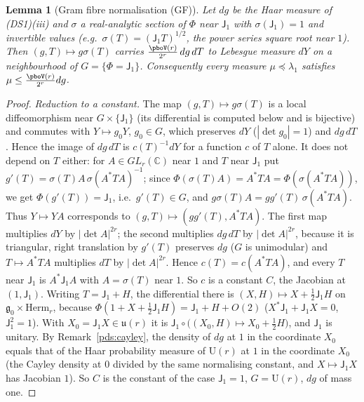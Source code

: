 \documentclass[10pt]{amsart}
\newtheorem{lemma}[theorem]{Lemma}
\theoremstyle{definition}
\theoremstyle{remark}
\newcommand{\C}{\mathbb C}
\begin{document}
\begin{lemma}[Gram fibre normalisation \textup{(GF)}]\label{pbo:GF}
Let $dg$ be the Haar measure of \textup{(DS1)(iii)} and $\sigma$ a real-analytic section of $\Phi$ near
$\mathsf J_1$ with $\sigma(\mathsf J_1)=1$ and invertible values (e.g.\ $\sigma(T)=(\mathsf J_1T)^{1/2}$, the
power series square root near $1$). Then $(g,T)\mapsto g\sigma(T)$ carries $\frac{\pboV(r)}{2^r}\,dg\,dT$ to
Lebesgue measure $dY$ on a neighbourhood of $G=\{\Phi=\mathsf J_1\}$. Consequently every measure
$\mu\preceq\lambda_1$ satisfies $\mu\le\frac{\pboV(r)}{2^r}dg$.
\end{lemma}
\begin{proof}
\emph{Reduction to a constant.} The map $(g,T)\mapsto g\sigma(T)$ is a local diffeomorphism near
$G\times\{\mathsf J_1\}$ (its differential is computed below and is bijective) and commutes with
$Y\mapsto g_0Y$, $g_0\in G$, which preserves $dY$ ($|\det g_0|=1$) and $dg\,dT$. Hence the image of
$dg\,dT$ is $c(T)^{-1}dY$ for a function $c$ of $T$ alone. It does not depend on $T$ either: for
$A\in GL_r(\C)$ near $1$ and $T$ near $\mathsf J_1$ put $g'(T)=\sigma(T)A\,\sigma(A^*TA)^{-1}$; since
$\Phi(\sigma(T)A)=A^*TA=\Phi(\sigma(A^*TA))$, we get $\Phi(g'(T))=\mathsf J_1$, i.e.\ $g'(T)\in G$, and
$g\sigma(T)A=gg'(T)\,\sigma(A^*TA)$. Thus $Y\mapsto YA$ corresponds to $(g,T)\mapsto(gg'(T),A^*TA)$. The
first map multiplies $dY$ by $|\det A|^{2r}$; the second multiplies $dg\,dT$ by $|\det A|^{2r}$, because
it is triangular, right translation by $g'(T)$ preserves $dg$ ($G$ is unimodular) and $T\mapsto A^*TA$
multiplies $dT$ by $|\det A|^{2r}$. Hence $c(T)=c(A^*TA)$, and every $T$ near $\mathsf J_1$ is
$A^*\mathsf J_1A$ with $A=\sigma(T)$ near $1$. So $c$ is a constant $C$, the Jacobian at $(1,\mathsf J_1)$. Writing $T=\mathsf J_1+H$,
the differential there is $(X,H)\mapsto X+\frac12\mathsf J_1H$ on $\mathfrak g_0\times\mathrm{Herm}_r$, because
$\Phi(1+X+\frac12\mathsf J_1H)=\mathsf J_1+H+O(2)$ ($X^*\mathsf J_1+\mathsf J_1X=0$, $\mathsf J_1^2=1$). With
$X_0=\mathsf J_1X\in\mathfrak u(r)$ it is $\mathsf J_1\circ\bigl((X_0,H)\mapsto X_0+\frac12H\bigr)$, and $\mathsf J_1$ is
unitary. By Remark~\ref{pds:cayley}, the density of $dg$ at $1$ in the coordinate $X_0$ equals that of the
Haar probability measure of $\mathrm U(r)$ at $1$ in the coordinate $X_0$ (the Cayley density at $0$ divided
by the same normalising constant, and $X\mapsto\mathsf J_1X$ has Jacobian $1$). So $C$ is the constant of the
case $\mathsf J_1=1$, $G=\mathrm U(r)$, $dg$ of mass one.


\end{proof}
\end{document}
